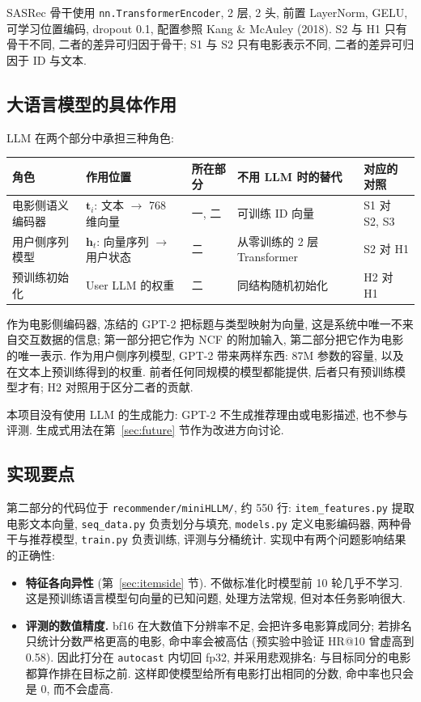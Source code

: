 \documentclass{article}
\begin{document}
SASRec 骨干使用 \texttt{nn.TransformerEncoder}, 2 层, 2 头, 前置 LayerNorm, GELU, 可学习位置编码, dropout 0.1, 配置参照 Kang \& McAuley (2018). S2 与 H1 只有骨干不同, 二者的差异可归因于骨干; S1 与 S2 只有电影表示不同, 二者的差异可归因于 ID 与文本.

\subsection{大语言模型的具体作用}

LLM 在两个部分中承担三种角色:

\begin{center}
\small
\begin{tabularx}{\textwidth}{lXlXl}
\toprule
角色 & 作用位置 & 所在部分 & 不用 LLM 时的替代 & 对应的对照 \\
\midrule
电影侧语义编码器 & $\mathbf{t}_i$: 文本 $\rightarrow$ 768 维向量 & 一, 二 & 可训练 ID 向量 & S1 对 S2, S3 \\
用户侧序列模型 & $\mathbf{h}_t$: 向量序列 $\rightarrow$ 用户状态 & 二 & 从零训练的 2 层 Transformer & S2 对 H1 \\
预训练初始化 & User LLM 的权重 & 二 & 同结构随机初始化 & H2 对 H1 \\
\bottomrule
\end{tabularx}
\end{center}

作为电影侧编码器, 冻结的 GPT-2 把标题与类型映射为向量, 这是系统中唯一不来自交互数据的信息; 第一部分把它作为 NCF 的附加输入, 第二部分把它作为电影的唯一表示. 作为用户侧序列模型, GPT-2 带来两样东西: 87M 参数的容量, 以及在文本上预训练得到的权重. 前者任何同规模的模型都能提供, 后者只有预训练模型才有; H2 对照用于区分二者的贡献.

本项目没有使用 LLM 的生成能力: GPT-2 不生成推荐理由或电影描述, 也不参与评测. 生成式用法在第~\ref{sec:future} 节作为改进方向讨论.

\subsection{实现要点}
\label{sec:impl}

第二部分的代码位于 \texttt{recommender/miniHLLM/}, 约 550 行: \texttt{item\_features.py} 提取电影文本向量, \texttt{seq\_data.py} 负责划分与填充, \texttt{models.py} 定义电影编码器, 两种骨干与推荐模型, \texttt{train.py} 负责训练, 评测与分桶统计. 实现中有两个问题影响结果的正确性:
\begin{itemize}
  \item \textbf{特征各向异性} (第~\ref{sec:itemside} 节). 不做标准化时模型前 10 轮几乎不学习. 这是预训练语言模型句向量的已知问题, 处理方法常规, 但对本任务影响很大.
  \item \textbf{评测的数值精度.} bf16 在大数值下分辨率不足, 会把许多电影算成同分; 若排名只统计分数严格更高的电影, 命中率会被高估 (预实验中验证 HR@10 曾虚高到 0.58). 因此打分在 \texttt{autocast} 内切回 fp32, 并采用悲观排名: 与目标同分的电影都算作排在目标之前. 这样即使模型给所有电影打出相同的分数, 命中率也只会是 0, 而不会虚高.
\end{itemize}
\end{document}
